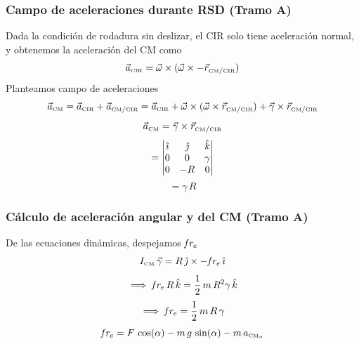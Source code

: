 \begin{frame}
	\frametitle{Campo de aceleraciones durante RSD (Tramo A)}
	Dada la condición de rodadura sin deslizar, el CIR solo tiene aceleración normal, y obtenemos la aceleración del CM como
	$$ \vec{a}_{\text{\tiny CIR}} = \vec{\omega} \times (\vec{\omega} \times -\vec{r}_{\text{\tiny CM}/\text{\tiny CIR}}) $$
	Planteamos campo de aceleraciones
	$$ \vec{a}_{\text{\tiny CM}} = \vec{a}_\text{\tiny CIR} + \vec{a}_{\text{\tiny CM}/\text{\tiny CIR}} = \vec{a}_{\text{\tiny CIR}} + \vec{\omega} \times (\vec{\omega} \times \vec{r}_{\text{\tiny CM}/\text{\tiny CIR}}) + \vec{\gamma} \times \vec{r}_{\text{\tiny CM}/\text{\tiny CIR}} $$
	$$ \vec{a}_{\text{\tiny CM}} = \vec{\gamma} \times \vec{r}_{\text{\tiny CM}/\text{\tiny CIR}} $$
	$$ = \left|\begin{matrix}
			\hat{\imath} & \hat{\jmath} & \hat{k} \\
			0      & 0      & \gamma  \\
			0      & -R     & 0
		\end{matrix}\right| $$
	$$ = \gamma\,R $$

\end{frame}

\begin{frame}
	\frametitle{Cálculo de aceleración angular y del CM (Tramo A)}
	\begin{figure}
	\end{figure}
	De las ecuaciones dinámicas, despejamos $\mathit{f\kern-0.05em r}\kern-0.05em_{e}$
	$$ I_{\text{\tiny CM}}\,\vec{\gamma} = R\,\hat{\jmath} \times -\mathit{f\kern-0.05em r}\kern-0.05em_{e} \, \hat{\imath}$$ $$ \implies  \mathit{f\kern-0.05em r}\kern-0.05em_{e}\,R\,\hat{k} = \frac{1}{2}\,m\,R^2 \gamma\,\hat{k} $$
	$$ \implies \mathit{f\kern-0.05em r}\kern-0.05em_{e} = \frac{1}{2}\,m\,R\,\gamma$$
	$$ \mathit{f\kern-0.05em r}\kern-0.05em_{e} = F\,\cos(\alpha) - m\,g\,\sin(\alpha) - m\,a_{\text{\tiny CM}_x} $$
\end{frame}


